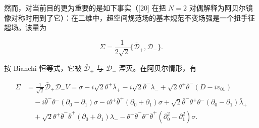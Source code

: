 然而，对当前目的更为重要的是如下事实（[20] 在把 $N=2$ 对偶解释为阿贝尔镜像对称时用到了它）：在二维中，超空间规范场的基本规范不变场强是一个扭手征超场。该量为

\begin{equation}
\Sigma=\frac{1}{2\sqrt2}\{\bar{\mathcal D}_+,\mathcal D_-\}.
\tag{2.15}
\end{equation}


按 Bianchi 恒等式，它被 $\bar{\mathcal D}_+$ 与 $\mathcal D_-$ 湮灭。在阿贝尔情形，有

\begin{equation}
\begin{aligned}
\Sigma &= \frac{1}{\sqrt2}\bar{\mathcal D}_+\mathcal D_-V=\sigma-i\sqrt2\theta^+\bar\lambda_+-i\sqrt2\bar\theta^-\lambda_-+\sqrt2\theta^+\bar\theta^-(D-iv_{01})\\
&\quad -i\bar\theta^-\theta^-(\partial_0-\partial_1)\sigma-i\theta^+\bar\theta^+(\partial_0+\partial_1)\sigma+\sqrt2\bar\theta^-\theta^+\theta^-(\partial_0-\partial_1)\bar\lambda_+\\
&\quad +\sqrt2\theta^+\bar\theta^-\bar\theta^+(\partial_0+\partial_1)\lambda_--\theta^+\bar\theta^-\theta^-\bar\theta^+(\partial_0^2-\partial_1^2)\sigma.
\end{aligned}
\tag{2.16}
\end{equation}
